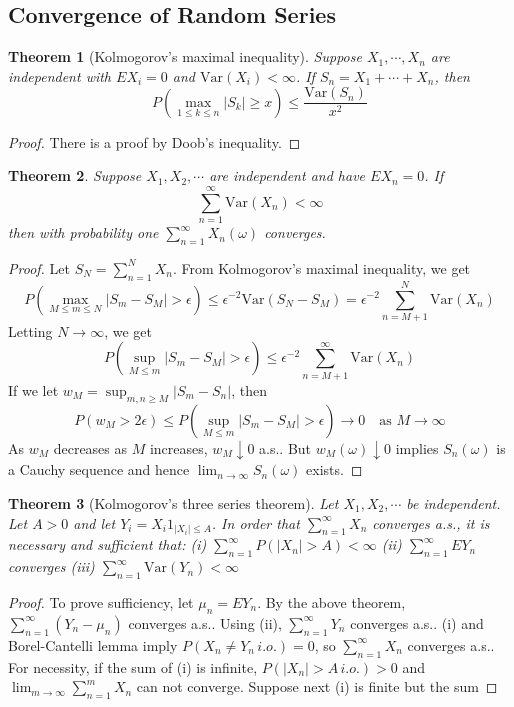 \documentclass{article}
\newtheorem{Thm}{Theorem}[section]
\theoremstyle{definition}
\begin{document}
\subsection{Convergence of Random Series}

\begin{Thm}[Kolmogorov's maximal inequality]
    Suppose $X_1,\cdots,X_n$ are independent with $EX_i=0$ and $\text{Var}(X_i)<\infty$. If $S_n=X_1+\cdots+X_n$, then
    \[P(\max_{1\le k\le n}\left|S_k\right|\ge x)\le \frac{\text{Var}(S_n)}{x^2}\] 
\end{Thm}
\begin{proof}
    There is a proof by Doob's inequality.
\end{proof}

\begin{Thm}
    Suppose $X_1,X_2,\cdots$ are independent and have $EX_n=0$. If \[\sum_{n=1}^\infty \text{Var}(X_n)<\infty\] 
    then with probability one $\sum_{n=1}^\infty X_n(\omega)$ converges.
\end{Thm}
\begin{proof}
    Let $S_N=\sum_{n=1}^N X_n$. From Kolmogorov's maximal inequality, we get 
    \[P(\max_{M\le m\le N}\left|S_m-S_M\right|>\epsilon)\le \epsilon^{-2}\text{Var}(S_N-S_M)=\epsilon^{-2}\sum_{n=M+1}^N\text{Var}(X_n)\] 
    Letting $N\to\infty$, we get \[P(\sup_{M\le m}\left|S_m-S_M\right|>\epsilon)\le \epsilon^{-2}\sum_{n=M+1}^\infty\text{Var}(X_n)\] 
    If we let $w_M=\sup_{m,n\ge M}\left|S_m-S_n\right|$, then \[P(w_M>2\epsilon)\le P(\sup_{M\le m}\left|S_m-S_M\right|>\epsilon)\to 0\quad\text{as }M\to\infty\]
    As $w_M$ decreases as $M$ increases, $w_M\downarrow 0$ a.s.. But $w_M(\omega)\downarrow 0$ implies $S_n(\omega)$ is a Cauchy sequence
    and hence $\lim_{n\to\infty}S_n(\omega)$ exists.
\end{proof}

\begin{Thm}[Kolmogorov's three series theorem]
    Let $X_1,X_2,\cdots$ be independent. Let $A>0$ and let $Y_i=X_i1_{\left|X_i\right|\le A}$. In order that $\sum_{n=1}^\infty X_n$ converges a.s.,
    it is necessary and sufficient that:\newline 
    (i) $\sum_{n=1}^\infty P(\left|X_n\right|>A)<\infty$\newline 
    (ii) $\sum_{n=1}^\infty EY_n$ converges \newline 
    (iii) $\sum_{n=1}^\infty \text{Var}(Y_n)<\infty$
\end{Thm}
\begin{proof}
    To prove sufficiency, let $\mu_n=EY_n$. By the above theorem, $\sum_{n=1}^\infty(Y_n-\mu_n)$ converges a.s..
    Using (ii), $\sum_{n=1}^\infty Y_n$ converges a.s.. (i) and Borel-Cantelli lemma imply $P(X_n\ne Y_n\, i.o.)=0$, so $\sum_{n=1}^\infty X_n$ converges a.s..
    \newline 
    For necessity, if the sum of (i) is infinite, $P(\left|X_n\right|>A\, i.o.)>0$ and $\lim_{m\to\infty} \sum_{n=1}^m X_n$ can not converge.
    Suppose next (i) is finite but the sum 
\end{proof}
\end{document}
